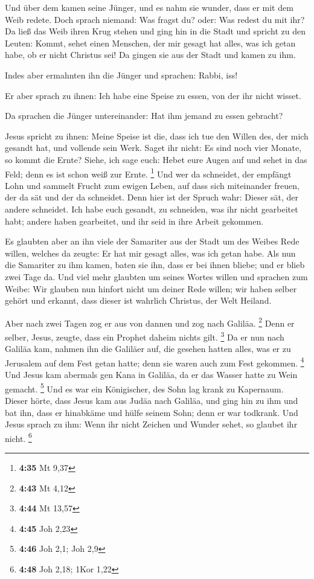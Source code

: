  Und über dem kamen seine Jünger, und es nahm sie wunder,
dass er mit dem Weib redete. Doch sprach niemand: Was fragst du? oder:
Was redest du mit ihr?  Da ließ das Weib ihren Krug stehen
und ging hin in die Stadt und spricht zu den Leuten: 
Kommt, sehet einen Menschen, der mir gesagt hat alles, was ich getan
habe, ob er nicht Christus sei!  Da gingen sie aus der
Stadt und kamen zu ihm.

 Indes aber ermahnten ihn die Jünger und sprachen: Rabbi,
iss!

 Er aber sprach zu ihnen: Ich habe eine Speise zu essen,
von der ihr nicht wisset.

 Da sprachen die Jünger untereinander: Hat ihm jemand zu
essen gebracht?

 Jesus spricht zu ihnen: Meine Speise ist die, dass ich tue
den Willen des, der mich gesandt hat, und vollende sein Werk.
 Saget ihr nicht: Es sind noch vier Monate, so kommt die
Ernte? Siehe, ich sage euch: Hebet eure Augen auf und sehet in das Feld;
denn es ist schon weiß zur Ernte. \footnote{\textbf{4:35} Mt 9,37}
 Und wer da schneidet, der empfängt Lohn und sammelt Frucht
zum ewigen Leben, auf dass sich miteinander freuen, der da sät und der
da schneidet.  Denn hier ist der Spruch wahr: Dieser sät,
der andere schneidet.  Ich habe euch gesandt, zu schneiden,
was ihr nicht gearbeitet habt; andere haben gearbeitet, und ihr seid in
ihre Arbeit gekommen.

 Es glaubten aber an ihn viele der Samariter aus der Stadt
um des Weibes Rede willen, welches da zeugte: Er hat mir gesagt alles,
was ich getan habe.  Als nun die Samariter zu ihm kamen,
baten sie ihn, dass er bei ihnen bliebe; und er blieb zwei Tage da.
 Und viel mehr glaubten um seines Wortes willen
 und sprachen zum Weibe: Wir glauben nun hinfort nicht um
deiner Rede willen; wir haben selber gehört und erkannt, dass dieser ist
wahrlich Christus, der Welt Heiland.

 Aber nach zwei Tagen zog er aus von dannen und zog nach
Galiläa. \footnote{\textbf{4:43} Mt 4,12}  Denn er selber,
Jesus, zeugte, dass ein Prophet daheim nichts gilt. \footnote{\textbf{4:44}
  Mt 13,57}  Da er nun nach Galiläa kam, nahmen ihn die
Galiläer auf, die gesehen hatten alles, was er zu Jerusalem auf dem Fest
getan hatte; denn sie waren auch zum Fest gekommen. \footnote{\textbf{4:45}
  Joh 2,23}  Und Jesus kam abermals gen Kana in Galiläa, da
er das Wasser hatte zu Wein gemacht. \footnote{\textbf{4:46} Joh 2,1;
  Joh 2,9}  Und es war ein Königischer, des Sohn lag krank
zu Kapernaum. Dieser hörte, dass Jesus kam aus Judäa nach Galiläa, und
ging hin zu ihm und bat ihn, dass er hinabkäme und hülfe seinem Sohn;
denn er war todkrank.  Und Jesus sprach zu ihm: Wenn ihr
nicht Zeichen und Wunder sehet, so glaubet ihr nicht. \footnote{\textbf{4:48}
  Joh 2,18; 1Kor 1,22}


